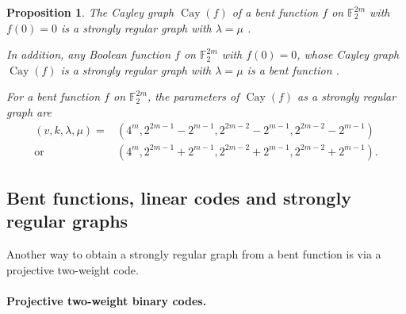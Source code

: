 \documentclass[12pt,a4paper]{article}
\newcommand{\mb}[1]{\mathbb{#1}}
\newcommand{\F}{\mb{F}}
\newcommand{\Cay}[1]{\operatorname{Cay}\left(#1\right)}
\newtheorem{Proposition}{Proposition}
\begin{document}


\begin{Proposition}
\label{pr-Cayley-bent-strongly-regular}
The Cayley graph $\Cay{f}$ of a bent function $f$ on $\F_2^{2m}$
with $f(0)=0$ is a strongly regular graph with $\lambda = \mu$ \cite[Lemma 12]{BerC99}.

In addition, any Boolean function $f$ on $\F_2^{2m}$ with $f(0)=0$,
whose Cayley graph $\Cay{f}$ is a strongly regular graph with $\lambda = \mu$ is a bent function
\cite[Theorem 3]{BerCV01} \cite[Theorem 3.1]{Sta07}.

For a bent function $f$ on $\F_2^{2m}$,
the parameters of $\Cay{f}$ as a strongly regular graph
are \cite[Theorem 6.2.10]{Dil74} \cite[Theorem 3.2]{HuaY04}
\begin{align*}
(v,k,\lambda,\mu) = &(4^m, 2^{2 m - 1} - 2^{m-1}, 2^{2 m - 2} - 2^{m-1}, 2^{2 m - 2} - 2^{m-1})
\\
  \text{or} \quad &(4^m, 2^{2 m - 1} + 2^{m-1}, 2^{2 m - 2} + 2^{m-1}, 2^{2 m - 2} + 2^{m-1}).
\end{align*}
\end{Proposition}

%
\subsection{Bent functions, linear codes and strongly regular graphs}
Another way to obtain a strongly regular graph from a bent function is via a projective two-weight
code.
\paragraph*{Projective two-weight binary codes.}
\end{document}
